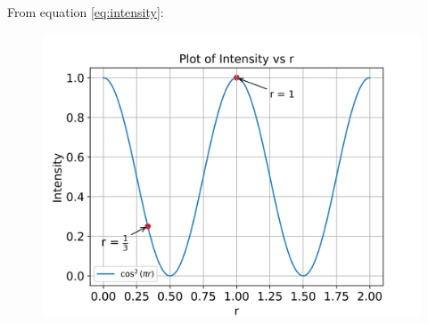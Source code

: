 \documentclass[journal,12pt,twocolumn]{IEEEtran}
\theoremstyle{remark}
\begin{document}
From equation \eqref{eq:intensity}:
\begin{figure}[htbp]
    \centering
    \includegraphics[width = \columnwidth]{figs/intensity_plot.png}
  \caption{}
    \label{fig:graph1}
\end{figure}

\end{document}
